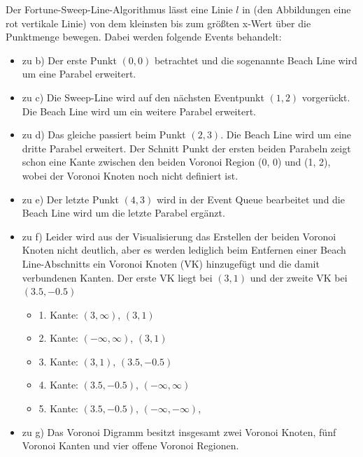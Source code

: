 \documentclass[a4paper]{article}
\begin{document}
\begin{figure}[!htb]
\end{figure} 


Der Fortune-Sweep-Line-Algorithmus lässt eine Linie $l$ in (den Abbildungen eine rot vertikale Linie) von dem kleinsten bis zum größten x-Wert über die Punktmenge bewegen. Dabei werden folgende Events behandelt:

\begin{itemize}
	\item zu b) Der erste Punkt $(0, 0)$ betrachtet und die sogenannte Beach Line wird um eine Parabel erweitert.
	\item zu c) Die Sweep-Line wird auf den nächsten Eventpunkt $(1, 2)$ vorgerückt. Die Beach Line wird um ein weitere Parabel erweitert.
	\item zu d) Das gleiche passiert beim Punkt $(2, 3)$. Die Beach Line wird um eine dritte Parabel erweitert. Der Schnitt Punkt der ersten beiden Parabeln zeigt schon eine Kante zwischen den beiden Voronoi Region (0, 0) und (1, 2), wobei der Voronoi Knoten noch nicht definiert ist.
	\item zu e) Der letzte Punkt $(4, 3)$ wird in der Event Queue bearbeitet und die Beach Line wird um die letzte Parabel ergänzt.
	\item zu f) Leider wird aus der Visualisierung das Erstellen der beiden Voronoi Knoten nicht deutlich, aber es werden lediglich beim Entfernen einer Beach Line-Abschnitts ein Voronoi Knoten (VK) hinzugefügt und die damit verbundenen Kanten. Der erste VK liegt bei $(3, 1)$ und der zweite VK bei $(3.5, -0.5)$
	\begin{itemize}
		\item	1. Kante: $(3, \infty)$, $(3, 1)$
		\item	2. Kante: $(-\infty, \infty)$, $(3, 1)$
		\item	3. Kante: $(3, 1)$, $(3.5, -0.5)$
		\item	4. Kante: $(3.5, -0.5)$, $(-\infty, \infty)$
		\item	5. Kante: $(3.5, -0.5)$, $(-\infty, -\infty)$, 
	\end{itemize}
	\item zu g) Das Voronoi Digramm besitzt insgesamt zwei Voronoi Knoten, fünf Voronoi Kanten und vier offene Voronoi Regionen.
\end{itemize}
\end{document}
